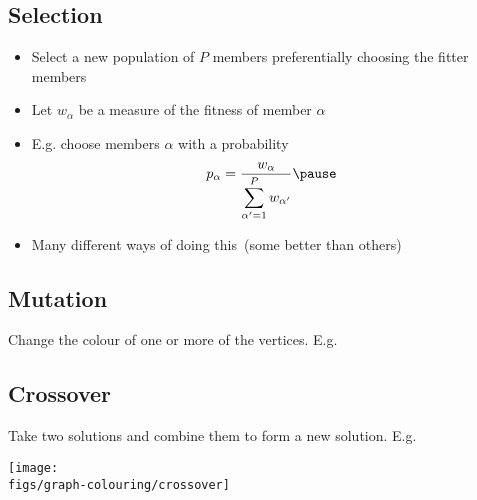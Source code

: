\begin{slide}
\section{Selection}

\begin{PauseHighLight}
  \begin{itemize}
  \item Select a new population of $P$ members preferentially choosing the
  fitter members\pause
\item Let $w_\alpha$ be a measure of the fitness of member $\alpha$\pause
\item E.g. choose members $\alpha$ with a probability
  \begin{displaymath}
    p_\alpha = \frac{w_\alpha}{\displaystyle \sum_{\alpha'=1}^P
      w_{\alpha'}}\pause
  \end{displaymath}
\item Many different ways of doing this\pause\ (some better than
  others)\pause 
  \end{itemize}
\end{PauseHighLight}

\end{slide}

\makeatletter
\renewcommand{\@mpm@format}[1]{#1.\the\@mpm@count}
\makeatother

\begin{slide}
\section[-2]{Mutation}

\pb
Change the colour of one or more of the vertices\pause. E.g.
\color{TextColor}
\begin{center}
  \pause
\end{center}

\end{slide}



\begin{slide}
\pb
\section{Crossover}
Take two solutions and combine them to form a new solution\pause. E.g.
\color{TextColor}
\begin{center}
  \texttt{[image: \\figs/graph-colouring/crossover]}\pause
\end{center}

\end{slide}

